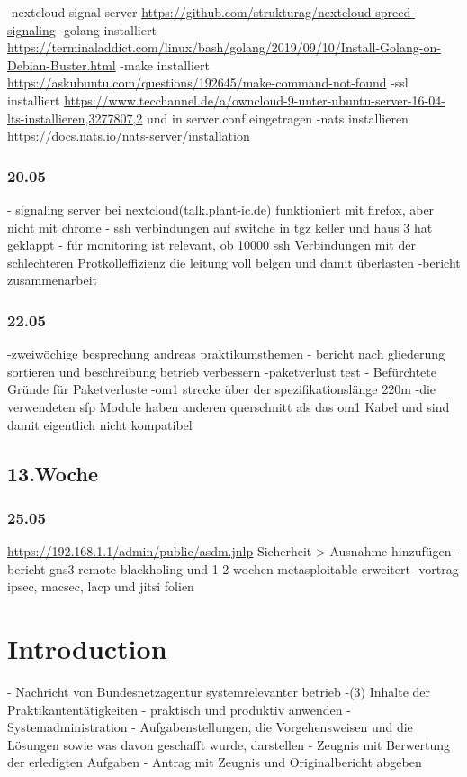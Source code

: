 \documentclass[english,runningheads,a4paper]{llncs}[2018/03/10]
\begin{document}
-nextcloud signal server \url{https://github.com/strukturag/nextcloud-spreed-signaling}
-golang installiert \url{https://terminaladdict.com/linux/bash/golang/2019/09/10/Install-Golang-on-Debian-Buster.html}
-make installiert \url{https://askubuntu.com/questions/192645/make-command-not-found}
-ssl installiert \url{https://www.tecchannel.de/a/owncloud-9-unter-ubuntu-server-16-04-lts-installieren,3277807,2} und in server.conf eingetragen
-nats installieren \url{https://docs.nats.io/nats-server/installation}
\subsubsection{20.05}
- signaling server bei nextcloud(talk.plant-ic.de) funktioniert mit firefox, aber nicht mit chrome
- ssh verbindungen auf switche in tgz keller und haus 3 hat geklappt
- für monitoring ist relevant, ob 10000 ssh Verbindungen mit der schlechteren Protkolleffizienz die leitung voll belgen und damit überlasten
-bericht zusammenarbeit
\subsubsection{22.05}
-zweiwöchige besprechung andreas praktikumsthemen
- bericht nach gliederung sortieren und beschreibung betrieb verbessern
-paketverlust test 
- Befürchtete Gründe für Paketverluste
-om1 strecke über der spezifikationslänge 220m 
-die verwendeten sfp Module haben anderen querschnitt als das om1 Kabel und sind damit eigentlich nicht kompatibel
\subsection{13.Woche}
\subsubsection{25.05}
 \url{https://192.168.1.1/admin/public/asdm.jnlp}
 Sicherheit > Ausnahme hinzufügen
-bericht gns3 remote blackholing und 1-2 wochen metasploitable erweitert
-vortrag ipsec, macsec, lacp und jitsi folien
\section{Introduction}\label{sec:intro}

- Nachricht von Bundesnetzagentur systemrelevanter betrieb
-(3) Inhalte der Praktikantentätigkeiten
- praktisch und produktiv anwenden
- Systemadministration
- Aufgabenstellungen,  die  Vorgehensweisen  und  die  Lösungen sowie was davon geschafft wurde, darstellen
- Zeugnis mit Berwertung der erledigten Aufgaben
- Antrag mit Zeugnis und Originalbericht abgeben
\end{document}
